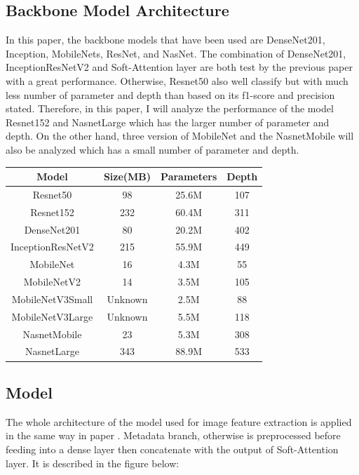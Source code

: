 \subsection{Backbone Model Architecture}
In this paper, the backbone models that have been used are DenseNet201\cite{06993}, Inception\cite{00567}, MobileNets\cite{04861}\cite{04381}\cite{02244}, ResNet\cite{03385}\cite{05027}, and NasNet\cite{07012}. The combination of DenseNet201, InceptionResNetV2 and Soft-Attention layer are both test by the previous paper\cite{03358} with a great performance. Otherwise, Resnet50 also well classify but with much less number of parameter and depth than based on its f1-score and precision stated. Therefore, in this paper, I will analyze the performance of the model Resnet152 and NasnetLarge which has the larger number of parameter and depth. On the other hand, three version of MobileNet and the NasnetMobile will also be analyzed which has a small number of parameter and depth.  
\begin{center}
	\begin{tabular}{|c | c c c|} 
		\hline
		Model & Size(MB) & Parameters & Depth \\ 
		\hline
		Resnet50 & 98 & 25.6M & 107 \\ 
		\hline
		Resnet152 & 232 & 60.4M & 311 \\ 
		\hline
		DenseNet201 & 80 & 20.2M & 402 \\
		\hline
		InceptionResNetV2 & 215 & 55.9M & 449 \\
		\hline
		MobileNet & 16 & 4.3M & 55 \\ 
		\hline
		MobileNetV2 & 14 & 3.5M & 105 \\ 
		\hline
		MobileNetV3Small & Unknown & 2.5M & 88 \\ 
		\hline
		MobileNetV3Large & Unknown & 5.5M & 118 \\
		\hline
		NasnetMobile & 23 & 5.3M & 308 \\
		\hline
		NasnetLarge & 343 & 88.9M & 533 \\ 
		\hline
	\end{tabular}
\end{center}

\subsection{Model}
The whole architecture of the model used for image feature extraction is applied in the same way in paper \cite{03358}. Metadata branch, otherwise is preprocessed before feeding into a dense layer then concatenate with the output of Soft-Attention layer. It is described in the figure below:


